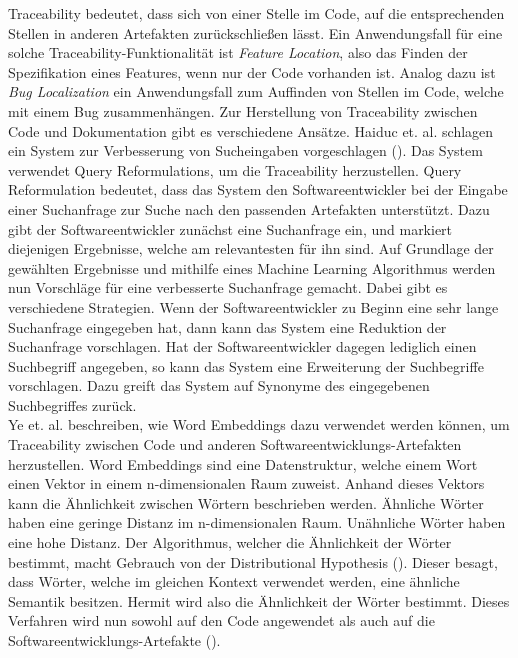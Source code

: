 Traceability bedeutet, dass sich von einer Stelle im Code, auf die entsprechenden Stellen in anderen Artefakten zurückschließen lässt.
Ein Anwendungsfall für eine solche Traceability-Funktionalität ist \textit{Feature Location}, also das Finden der Spezifikation eines Features, wenn nur der Code vorhanden ist.
Analog dazu ist \textit{Bug Localization} ein Anwendungsfall zum Auffinden von Stellen im Code, welche mit einem Bug zusammenhängen.
Zur Herstellung von Traceability zwischen Code und Dokumentation gibt es verschiedene Ansätze.
Haiduc et. al. schlagen ein System zur Verbesserung von Sucheingaben vorgeschlagen (\cite{Haiduc_Bavota_Marcus_Oliveto_DeLucia_Menzies_2013}).
Das System verwendet Query Reformulations, um die Traceability herzustellen.
Query Reformulation bedeutet, dass das System den Softwareentwickler bei der Eingabe einer Suchanfrage zur Suche nach den passenden Artefakten unterstützt.
Dazu gibt der Softwareentwickler zunächst eine Suchanfrage ein, und markiert diejenigen Ergebnisse, welche am relevantesten für ihn sind.
Auf Grundlage der gewählten Ergebnisse und mithilfe eines Machine Learning Algorithmus werden nun Vorschläge für eine verbesserte Suchanfrage gemacht.
Dabei gibt es verschiedene Strategien.
Wenn der Softwareentwickler zu Beginn eine sehr lange Suchanfrage eingegeben hat, dann kann das System eine Reduktion der Suchanfrage vorschlagen.
Hat der Softwareentwickler dagegen lediglich einen Suchbegriff angegeben, so kann das System eine Erweiterung der Suchbegriffe vorschlagen.
Dazu greift das System auf Synonyme des eingegebenen Suchbegriffes zurück.\\

Ye et. al. beschreiben, wie Word Embeddings dazu verwendet werden können, um Traceability zwischen Code und anderen Softwareentwicklungs-Artefakten herzustellen.
Word Embeddings sind eine Datenstruktur, welche einem Wort einen Vektor in einem n-dimensionalen Raum zuweist.
Anhand dieses Vektors kann die Ähnlichkeit zwischen Wörtern beschrieben werden.
Ähnliche Wörter haben eine geringe Distanz im n-dimensionalen Raum.
Unähnliche Wörter haben eine hohe Distanz.
Der Algorithmus, welcher die Ähnlichkeit der Wörter bestimmt, macht Gebrauch von der Distributional Hypothesis (\cite{Harris_1954}).
Dieser besagt, dass Wörter, welche im gleichen Kontext verwendet werden, eine ähnliche Semantik besitzen.
Hermit wird also die Ähnlichkeit der Wörter bestimmt.
Dieses Verfahren wird nun sowohl auf den Code angewendet als auch auf die Softwareentwicklungs-Artefakte (\cite{Ye_Shen_Ma_Bunescu_Liu_2016}).\\

